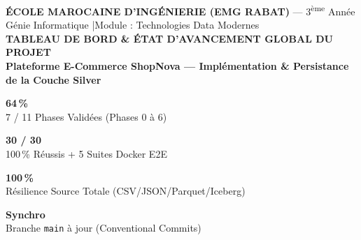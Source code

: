 \documentclass[9pt,a4paper,landscape]{article}
\begin{document}
\begin{center}
    {\small \textbf{ÉCOLE MAROCAINE D'INGÉNIERIE (EMG RABAT)} --- 3\textsuperscript{ème} Année Génie Informatique \quad|\quad Module : Technologies Data Modernes}\\[1pt]
    {\Large \textbf{\color{primary}TABLEAU DE BORD \& ÉTAT D'AVANCEMENT GLOBAL DU PROJET}}\\[1pt]
    {\normalsize \textbf{\color{secondary}Plateforme E-Commerce ShopNova --- Implémentation \& Persistance de la Couche Silver}}
\end{center}

\vspace{-0.1cm}

\noindent
\begin{minipage}[t]{0.235\textwidth}
    \begin{tcolorbox}[colback=primary!5!white,colframe=primary,title=\textbf{Progression Globale},halign=center,top=1mm,bottom=1mm,left=1mm,right=1mm]
        \textbf{\LARGE 64\,\%}\\[1pt]
        \scriptsize 7 / 11 Phases Validées (Phases 0 à 6)
    \end{tcolorbox}
\end{minipage}\hfill
\begin{minipage}[t]{0.235\textwidth}
    \begin{tcolorbox}[colback=successtext!5!white,colframe=successtext,title=\textbf{Tests Automatisés},halign=center,top=1mm,bottom=1mm,left=1mm,right=1mm]
        \textbf{\LARGE 30 / 30}\\[1pt]
        \scriptsize 100\,\% Réussis + 5 Suites Docker E2E
    \end{tcolorbox}
\end{minipage}\hfill
\begin{minipage}[t]{0.235\textwidth}
    \begin{tcolorbox}[colback=secondary!5!white,colframe=secondary,title=\textbf{Découplage Bronze},halign=center,top=1mm,bottom=1mm,left=1mm,right=1mm]
        \textbf{\LARGE 100\,\%}\\[1pt]
        \scriptsize Résilience Source Totale (CSV/JSON/Parquet/Iceberg)
    \end{tcolorbox}
\end{minipage}\hfill
\begin{minipage}[t]{0.235\textwidth}
    \begin{tcolorbox}[colback=purple!5!white,colframe=purple!75!black,title=\textbf{Dépôt Git \& GitHub},halign=center,top=1mm,bottom=1mm,left=1mm,right=1mm]
        \textbf{\LARGE Synchro}\\[1pt]
        \scriptsize Branche \texttt{main} à jour (Conventional Commits)
    \end{tcolorbox}
\end{minipage}
\end{document}
